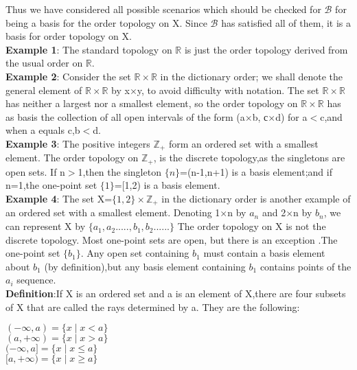 \documentclass[a4paper,english,12pt]{article}
\begin{document}
\begin{defn}
Thus we have considered all possible scenarios which should be checked for $\mathscr{B}$ for being a basis for the order topology on X. Since $\mathscr{B}$ has satisfied all of them, it is a basis for order topology on X.\\
\vspace{1mm}
{\bf Example 1}: The standard topology on $\mathbb{R}$ is just the order topology derived from the usual order on $\mathbb{R}$.\\
\vspace{1mm}
{\bf Example 2}: Consider the set $\mathbb{R}\times\mathbb{R}$ in the dictionary order; we shall denote the general element of $\mathbb{R}\times\mathbb{R}$ by x$\times$y, to avoid difficulty with notation. The set $\mathbb{R}\times\mathbb{R}$ has neither a
largest nor a smallest element, so the order topology on $\mathbb{R}\times\mathbb{R}$ has as basis the collection of all open intervals of the form (a$\times$b, с$\times$d) for a$<$c,and when a equals c,b$<$d.\\
{\bf Example 3}: The positive integers $\mathbb{Z}_+$ form an ordered set with a smallest element. The order topology on $\mathbb{Z}_+$, is the discrete topology,as the singletons are open sets. If n$>$1,then the singleton $\{n\}$=(n-1,n+1) is a basis element;and if n=1,the one-point set $\{1\}$=[1,2) is a basis element.\\
{\bf Example 4}: The set X=$\{1,2\}\times\mathbb{Z}_+$ in the dictionary order is another example of an ordered set with a smallest element. Denoting 1$\times$n by $a_n$ and 2$\times$n by $b_n$, we can represent X by $\{a_1,a_2.....,b_1,b_2......\}$
The order topology on X is not the discrete topology. Most one-point sets are open, but
there is an exception .The one-point set $\{b_1\}$. Any open set containing $b_1$ must contain a basis element about $b_1$ (by definition),but any basis element containing $b_1$ contains points of the $a_i$ sequence.\\
\vspace{2mm}
{\bf Definition}:If X is an ordered set and a is an element of X,there are four subsets of X that are called the rays determined by a. They are the following:\\
\begin{center}
$(-\infty,a)=\{x\mid x<a\}$\\
$(a,+\infty)=\{x\mid x>a\}$\\
$(-\infty,a]=\{x\mid x\leq a\}$\\
$[a,+\infty)=\{x\mid x\geq a\}$\\
\end{center}


\end{defn}
\end{document}
